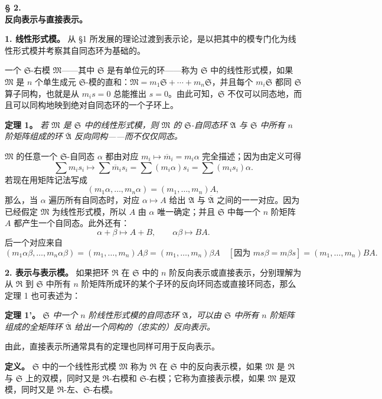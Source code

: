 \documentclass[11pt]{article}
\providecommand{\frR}{\mathfrak R}
\providecommand{\frS}{\mathfrak S}
\providecommand{\frM}{\mathfrak M}
\providecommand{\mA}{\mathfrak A}
\providecommand{\mbarA}{\overline{\mathfrak A}}
\begin{document}
\begin{center}
\textbf{§ 2.}\\[0.4em]
\textbf{反向表示与直接表示。}
\end{center}

\noindent\textbf{1. 线性形式模。} 从 §1 所发展的理论过渡到表示论，是以把其中的模专门化为线性形式模并考察其自同态环为基础的。

一个 \(\frS\)-右模 \(\frM\)——其中 \(\frS\) 是有单位元的环——称为 \(\frS\) 中的线性形式模，如果 \(\frM\) 是 \(n\) 个单生成元 \(\frS\)-模的直和：\(\frM=m_1\frS+\cdots+m_n\frS\)，并且每个 \(m_i\frS\) 都同 \(\frS\) 算子同构，也就是从 \(m_i s=0\) 总能推出 \(s=0\)。由此可知，\(\frS\) 不仅可以同态地，而且可以同构地映到绝对自同态环的一个子环上。

\noindent\textbf{定理 1。} \emph{若 \(\frM\) 是 \(\frS\) 中的线性形式模，则 \(\frM\) 的 \(\frS\)-自同态环 \(\mA\) 与 \(\frS\) 中所有 \(n\) 阶矩阵组成的环 \(\mbarA\) 反向同构——而不仅仅同态。}

\(\frM\) 的任意一个 \(\frS\)-自同态 \(\alpha\) 都由对应 \(m_i\longmapsto \overline m_i=m_i\alpha\) 完全描述；因为由定义可得
\[
        \sum m_i s_i\longmapsto
        \sum \overline m_i s_i
        =\sum (m_i\alpha)s_i
        =\sum (m_i s_i)\alpha.
\]
若现在用矩阵记法写成
\[
        (m_1\alpha,\ldots,m_n\alpha)=(m_1,\ldots,m_n)A,
\]
那么，当 \(\alpha\) 遍历所有自同态时，对应 \(\alpha\mapsto A\) 给出 \(\mA\) 与 \(\mbarA\) 之间的一一对应。因为已经假定 \(\frM\) 为线性形式模，所以 \(A\) 由 \(\alpha\) 唯一确定；并且 \(\frS\) 中每一个 \(n\) 阶矩阵 \(A\) 都产生一个自同态。此外还有：
\[
        \alpha+\beta\mapsto A+B,\qquad
        \alpha\beta\mapsto BA.
\]
后一个对应来自
\[
        (m_1\alpha\beta,\ldots,m_n\alpha\beta)
        =(m_1,\ldots,m_n)A\beta
        =(m_1,\ldots,m_n)\beta A
        \quad[\text{因为 }m s\beta=m\beta s]
        =(m_1,\ldots,m_n)BA.
\]

\noindent\textbf{2. 表示与表示模。} 如果把环 \(\frR\) 在 \(\frS\) 中的 \(n\) 阶反向表示或直接表示，分别理解为从 \(\frR\) 到 \(\frS\) 中所有 \(n\) 阶矩阵所成环的某个子环的反向环同态或直接环同态，那么定理 1 也可表述为：

\noindent\textbf{定理 1'。} \emph{\(\frS\) 中一个 \(n\) 阶线性形式模的自同态环 \(\mA\)，可以由 \(\frS\) 中所有 \(n\) 阶矩阵组成的全矩阵环 \(\mbarA\) 给出一个同构的（忠实的）反向表示。}

由此，直接表示所通常具有的定理也同样可用于反向表示。

\noindent\textbf{定义。} \(\frS\) 中的一个线性形式模 \(\frM\) 称为 \(\frR\) 在 \(\frS\) 中的反向表示模，如果 \(\frM\) 是 \(\frR\) 与 \(\frS\) 上的双模，同时又是 \(\frR\)-右模和 \(\frS\)-右模；它称为直接表示模，如果 \(\frM\) 是双模，同时又是 \(\frR\)-左、\(\frS\)-右模。
\end{document}
